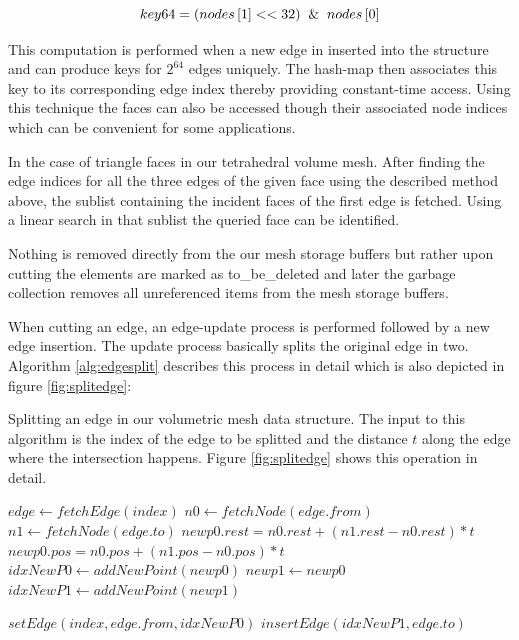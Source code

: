 \begin{equation}
 key64 = (nodes\left[ 1 \right] << 32) \And nodes\left[ 0 \right]
\end{equation}

This computation is performed when a new edge in inserted into the structure and can produce keys for $2^{64}$ edges uniquely. 
The hash-map then associates this key to its corresponding edge index thereby providing constant-time access. 
Using this technique the faces can also be accessed though their associated node indices which can be convenient for some applications. 

In the case of triangle faces in our tetrahedral volume mesh. After finding the edge indices for all the three edges of the given 
face using the described method above, the sublist containing the incident faces of the first edge is fetched. Using a linear search 
in that sublist the queried face can be identified. 

Nothing is removed directly from the our mesh storage buffers but rather upon cutting the elements
are marked as to\_be\_deleted and later the garbage collection removes all unreferenced items from the mesh storage buffers. 

When cutting an edge, an edge-update process is performed followed by a new edge insertion. 
The update process basically splits the original edge in two. Algorithm \ref{alg:edgesplit} describes this process
in detail which is also depicted in figure \ref{fig:splitedge}:

\begin{algorithm}[H]
\caption{Splitting an edge in our volumetric mesh data structure. The input to this algorithm is the index of the edge to be splitted
and the distance $t$ along the edge where the intersection happens. Figure \ref{fig:splitedge} shows this operation in detail. }
\label{alg:edgesplit}
\begin{algorithmic}[1]	
  \STATE $edge \gets fetchEdge(index)$
  \STATE $n0 \gets fetchNode(edge.from)$
  \STATE $n1 \gets fetchNode(edge.to)$
  \STATE $newp0.rest = n0.rest + (n1.rest - n0.rest) * t$
  \STATE $newp0.pos = n0.pos + (n1.pos - n0.pos) * t$
  \STATE $idxNewP0 \gets addNewPoint(newp0)$
  \STATE $newp1 \gets newp0$
  \STATE $idxNewP1 \gets addNewPoint(newp1)$
  
  \STATE $setEdge(index, edge.from, idxNewP0)$
  \STATE $insertEdge(idxNewP1, edge.to)$

\end{algorithmic}
\end{algorithm}



